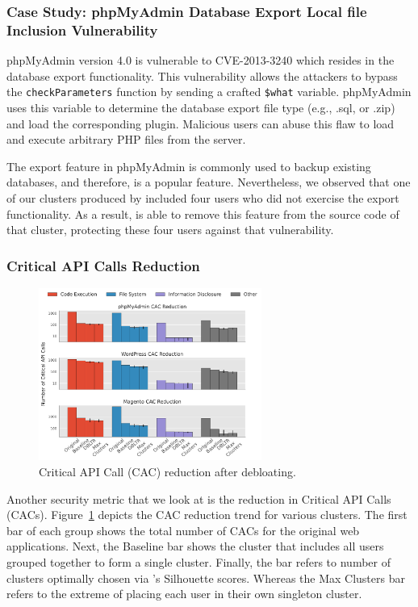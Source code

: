 \subsubsection{Case Study: phpMyAdmin Database Export Local file Inclusion Vulnerability}

phpMyAdmin version 4.0 is vulnerable to CVE-2013-3240 which resides in the database export functionality. 
This vulnerability allows the attackers to bypass the \texttt{checkParameters} function by sending a crafted \texttt{\$what} variable. 
phpMyAdmin uses this variable to determine the database export file type (e.g., .sql, or .zip) and load the corresponding plugin. 
Malicious users can abuse this flaw to load and execute arbitrary PHP files from the server. 

The export feature in phpMyAdmin is commonly used to backup existing databases, and therefore, is a popular feature. 
Nevertheless, we observed that one of our clusters produced by \dbltr{} included four users who did not exercise the export functionality. As a result, \dbltr{} is able to remove this feature from the source code of that cluster, protecting these four users against that vulnerability. 

\subsubsection{Critical API Calls Reduction}

\begin{figure}[t]
    \centering
    \includegraphics[width=0.65\textwidth]{figures/dbltr/cac_reduction.pdf}
    \caption{Critical API Call (CAC) reduction after debloating.}
    \label{fig:cac_reduction}
\end{figure}

Another security metric that we look at is the reduction in Critical API Calls (CACs). 
Figure~\ref{fig:cac_reduction} depicts the CAC reduction trend for various clusters. 
The first bar of each group shows the total number of CACs for the original web applications.
Next, the Baseline bar shows the cluster that includes all users grouped together to form a single cluster. 
Finally, the \dbltr{} bar refers to number of clusters optimally chosen via \dbltr{}'s Silhouette scores. 
Whereas the Max Clusters bar refers to the extreme of placing each user in their own singleton cluster.

